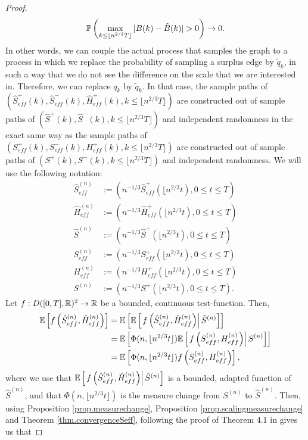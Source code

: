 \begin{proof}
$$\P\left(\max_{k\leq \lfloor n^{2/3} T \rfloor}|B(k)-\tilde{B}(k)|>0\right)\to 0.$$
In other words, we can couple the actual process that samples the graph to a process in which we replace the probability of sampling a surplus edge by $\tilde{q}_k$, in such a way that we do not see the difference on the scale that we are interested in. Therefore, we can replace $q_k$ by $\tilde{q}_k$. In that case, the sample paths of $(\hat{S}^+_{eff}(k),\hat{S}^-_{eff}(k), \hat{H}^+_{eff}(k), k \leq \lfloor n^{2/3}T\rfloor )$ are constructed out of sample paths of $(\hat{S}^+(k),\hat{S}^-(k), k\leq \lfloor n^{2/3}T\rfloor )$ and independent randomness in the exact same way as the sample paths of $({S}^+_{eff}(k),{S}^-_{eff}(k), {H}^+_{eff}(k), k \leq \lfloor n^{2/3}T\rfloor )$ are constructed out of sample paths of $({S}^+(k),{S}^-(k), k\leq \lfloor n^{2/3}T\rfloor )$ and independent randomness. 
We will use the following notation:\begin{align*}
    \hat{S}_{eff}^{(n)}&:=\left(n^{-1/3}\hat{S}^+_{eff}\left(\lfloor n^{2/3} t \right),0\leq t \leq T\right)\\
    \hat{H}_{eff}^{(n)}&:=\left(n^{-1/3}\hat{H}^+_{eff}\left(\lfloor n^{2/3} t \right),0\leq t \leq T\right)\\
    \hat{S}^{(n)}&:=\left(n^{-1/3}\hat{S}^+\left(\lfloor n^{2/3} t \right),0\leq t \leq T\right)\\
     {S}_{eff}^{(n)}&:=\left(n^{-1/3}{S}^+_{eff}\left(\lfloor n^{2/3} t \right),0\leq t \leq T\right)\\
    {H}_{eff}^{(n)}&:=\left(n^{-1/3}{H}^+_{eff}\left(\lfloor n^{2/3} t \right),0\leq t \leq T\right)\\
    {S}^{(n)}&:=\left(n^{-1/3}{S}^+\left(\lfloor n^{2/3} t \right),0\leq t \leq T\right).
\end{align*}
Let $f:D([0,T],{\mathbb R})^2\to {\mathbb R}$ be a bounded, continuous test-function. Then,
\begin{align*}{\mathbb E}\left[f\left(\hat{S}_{eff}^{(n)},  \hat{H}_{eff}^{(n)}\right) \right]&= {\mathbb E}\left[ {\mathbb E}\left[\left. f\left(\hat{S}_{eff}^{(n)},  \hat{H}_{eff}^{(n)}\right)\right|\hat{S}^{(n)}\right]\right]\\&={\mathbb E}\left[ \Phi(n,\lfloor n^{2/3} t\rfloor){\mathbb E}\left[\left.f\left({S}_{eff}^{(n)},  {H}_{eff}^{(n)}\right)\right| {S}^{(n)}\right]\right]\\&={\mathbb E}\left[ \Phi(n,\lfloor n^{2/3} t\rfloor)f\left({S}_{eff}^{(n)},  {H}_{eff}^{(n)}\right)\right],\end{align*}
where we use that ${\mathbb E}\left[\left. f\left(\hat{S}_{eff}^{(n)},  \hat{H}_{eff}^{(n)}\right)\right|\hat{S}^{(n)}\right]$ is a bounded, adapted function of $\hat{S}^{(n)}$, and that $\Phi(n,\lfloor n^{2/3} t\rfloor)$ is the measure change from ${S}^{(n)}$ to $\hat{S}^{(n)}$. Then, using Proposition \ref{prop.measurechange}, Proposition \ref{prop.scalingmeasurechange} and Theorem \ref{thm.convergenceSeff}, following the proof of Theorem 4.1 in \cite{Conchon2018} gives us that 

\end{proof}
